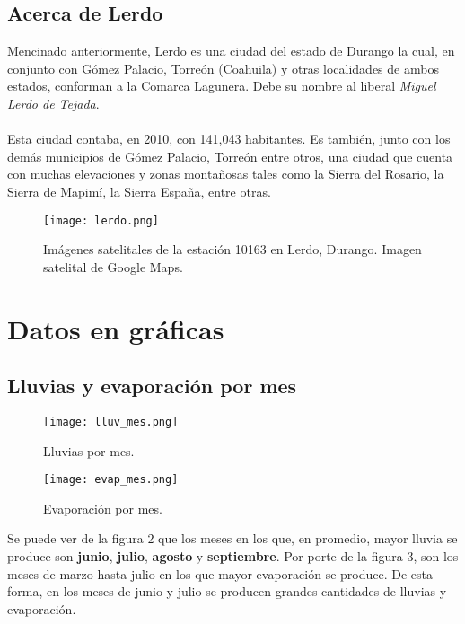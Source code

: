 \documentclass[12pt]{article}
\begin{document}
\subsection{Acerca de Lerdo}

Mencinado anteriormente, Lerdo es una ciudad del estado de Durango la cual, en conjunto con Gómez Palacio, Torreón (Coahuila) y otras localidades de ambos estados, conforman a la Comarca Lagunera.
Debe su nombre al liberal \textit{Miguel Lerdo de Tejada}.\\\\Esta ciudad contaba, en 2010, con 141,043 habitantes. Es también, junto con los demás municipios de Gómez Palacio, Torreón entre otros, una ciudad que cuenta con muchas elevaciones y zonas montañosas tales como la Sierra del Rosario, la Sierra de Mapimí, la Sierra España, entre otras.

    \begin{figure}[H]
        \centering
        \texttt{[image: lerdo.png]}
        \caption{\small{Imágenes satelitales de la estación 10163 en Lerdo, Durango. Imagen satelital de Google Maps.}}
    \end{figure}
\clearpage

\section{Datos en gráficas}
\subsection{Lluvias y evaporación por mes}

    \begin{figure}[H]
        \centering
        \texttt{[image: lluv\_mes.png]}
        \caption{Lluvias por mes.}
    \end{figure}

    \begin{figure}[H]
        \centering
        \texttt{[image: evap\_mes.png]}
        \caption{Evaporación por mes.}
    \end{figure}

Se puede ver de la figura 2 que los meses en los que, en promedio, mayor lluvia se produce son \textbf{junio}, \textbf{julio}, \textbf{agosto} y \textbf{septiembre}. Por porte de la figura 3, son los meses de marzo hasta julio en los que mayor evaporación se produce. De esta forma, en los meses de junio y julio se producen grandes cantidades de lluvias y evaporación.
\end{document}

